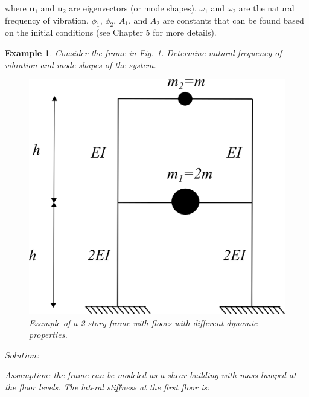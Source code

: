 \documentclass[12pt,letter]{article}
\newtheorem{ex}{Example}
\numberwithin{ex}{section} %
\newenvironment{example}{\begin{mdframed}[middlelinewidth=0.5mm]\begin{ex}\normalfont}{\end{ex}\end{mdframed}}
\numberwithin{re}{section} %
\begin{document}
\noindent where $\mathbf{u}_1$ and  $\mathbf{u}_2$ are eigenvectors (or mode shapes), $\omega_1$ and $\omega_2$ are the natural frequency of vibration, 
$\phi_1$, $\phi_2$, $A_1$, and $A_2$ are constants that can be found based on the initial conditions (see Chapter 5 for more details).

\vspace{4ex}

		
\begin{example}

Consider the frame in Fig. \ref{fig:two_story_frame_ex}. Determine natural frequency of vibration and mode shapes of the system.

\begin{figure}[H]
	\centering
	\includegraphics{../figures/two_story_frame_example.png}
	\caption{Example of a 2-story frame with floors with different dynamic properties.}
	\label{fig:two_story_frame_ex}
\end{figure}




\noindent $Solution$:

\vspace{1ex}
	
Assumption: the frame can be modeled as a shear building with mass lumped at the floor levels. The lateral stiffness at the first floor is:


\end{example}
\end{document}
